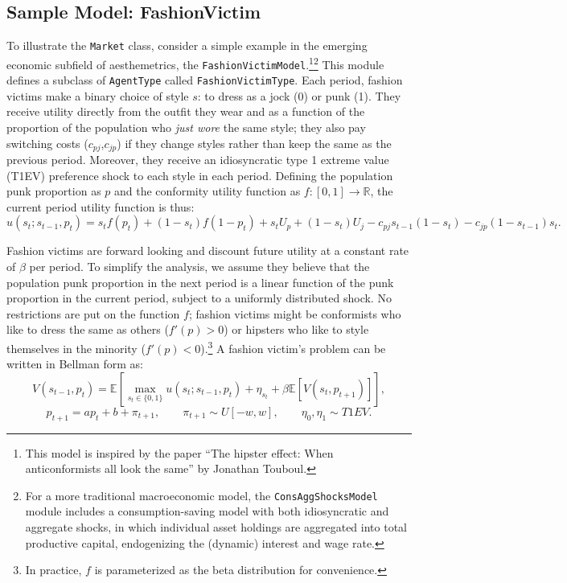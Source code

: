 \documentclass[12pt,titlepage,letterpaper]{econtex}
\providecommand{\E}{\mathbb{E}}
\begin{document}
{\subsection{Sample Model: FashionVictim}\label{sec:FashionVictim}

To illustrate the \texttt{Market} class, consider a simple example in the emerging economic subfield of aesthemetrics, the \texttt{FashionVictimModel}.\footnote{This model is inspired by the paper ``The hipster effect: When anticonformists all look the same'' by Jonathan Touboul.}\footnote{For a more traditional macroeconomic model, the \texttt{ConsAggShocksModel} module includes a consumption-saving model with both idiosyncratic and aggregate shocks, in which individual asset holdings are aggregated into total productive capital, endogenizing the (dynamic) interest and wage rate.}  This module defines a subclass of \texttt{AgentType} called \texttt{FashionVictimType}.  Each period, fashion victims make a binary choice of style $s$: to dress as a jock (0) or punk (1).  They receive utility directly from the outfit they wear and as a function of the proportion of the population who \textit{just wore} the same style; they also pay switching costs ($c_{pj}$,$c_{jp}$) if they change styles rather than keep the same as the previous period.  Moreover, they receive an idiosyncratic type 1 extreme value (T1EV) preference shock to each style in each period.  Defining the population punk proportion as $p$ and the conformity utility function as $f:[0,1]\rightarrow \mathbb{R}$, the current period utility function is thus:
\begin{equation*}
u(s_t;s_{t-1},p_t) = s_t f(p_t) + (1-s_t) f(1-p_t) + s_t U_p + (1-s_t) U_j - c_{pj} s_{t-1}(1-s_t) - c_{jp}(1-s_{t-1})s_t.
\end{equation*}

Fashion victims are forward looking and discount future utility at a constant rate of $\beta$ per period.  To simplify the analysis, we assume they believe that the population punk proportion in the next period is a linear function of the punk proportion in the current period, subject to a uniformly distributed shock.  No restrictions are put on the function $f$; fashion victims might be conformists who like to dress the same as others ($f'(p) > 0$) or hipsters who like to style themselves in the minority ($f'(p) < 0$).\footnote{In practice, $f$ is parameterized as the beta distribution for convenience.}  A fashion victim's problem can be written in Bellman form as:
\begin{equation*}
V(s_{t-1},p_t) = \E \left[ \max_{s_t \in \{0,1\}} u(s_t;s_{t-1},p_t) + \eta_{s_t} + \beta \E \left[ V(s_t,p_{t+1}) \right] \right], 
\end{equation*}
\begin{equation*}
p_{t+1} = a p_t + b + \pi_{t+1}, \qquad \pi_{t+1} \sim U[-w,w], \qquad \eta_0,\eta_1 \sim T1EV.
\end{equation*}

}
\end{document}
